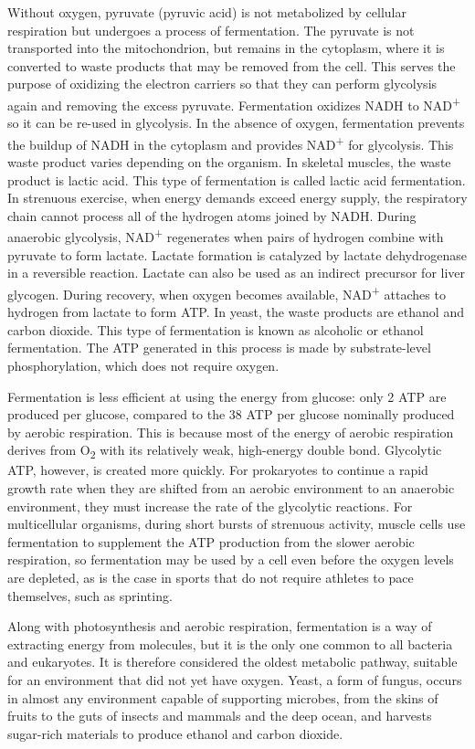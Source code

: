 Without oxygen, pyruvate (pyruvic acid) is not metabolized by cellular respiration but undergoes a process of fermentation. The pyruvate is not transported into the mitochondrion, but remains in the cytoplasm, where it is converted to waste products that may be removed from the cell. This serves the purpose of oxidizing the electron carriers so that they can perform glycolysis again and removing the excess pyruvate. Fermentation oxidizes NADH to NAD\textsuperscript{+} so it can be re-used in glycolysis. In the absence of oxygen, fermentation prevents the buildup of NADH in the cytoplasm and provides NAD\textsuperscript{+} for glycolysis. This waste product varies depending on the organism. In skeletal muscles, the waste product is lactic acid. This type of fermentation is called lactic acid fermentation. In strenuous exercise, when energy demands exceed energy supply, the respiratory chain cannot process all of the hydrogen atoms joined by NADH. During anaerobic glycolysis, NAD\textsuperscript{+} regenerates when pairs of hydrogen combine with pyruvate to form lactate. Lactate formation is catalyzed by lactate dehydrogenase in a reversible reaction. Lactate can also be used as an indirect precursor for liver glycogen. During recovery, when oxygen becomes available, NAD\textsuperscript{+} attaches to hydrogen from lactate to form ATP. In yeast, the waste products are ethanol and carbon dioxide. This type of fermentation is known as alcoholic or ethanol fermentation. The ATP generated in this process is made by substrate-level phosphorylation, which does not require oxygen.

Fermentation is less efficient at using the energy from glucose: only 2 ATP are produced per glucose, compared to the 38 ATP per glucose nominally produced by aerobic respiration. This is because most of the energy of aerobic respiration derives from O\textsubscript{2} with its relatively weak, high-energy double bond. Glycolytic ATP, however, is created more quickly. For prokaryotes to continue a rapid growth rate when they are shifted from an aerobic environment to an anaerobic environment, they must increase the rate of the glycolytic reactions. For multicellular organisms, during short bursts of strenuous activity, muscle cells use fermentation to supplement the ATP production from the slower aerobic respiration, so fermentation may be used by a cell even before the oxygen levels are depleted, as is the case in sports that do not require athletes to pace themselves, such as sprinting.

Along with photosynthesis and aerobic respiration, fermentation is a way of extracting energy from molecules, but it is the only one common to all bacteria and eukaryotes. It is therefore considered the oldest metabolic pathway, suitable for an environment that did not yet have oxygen. Yeast, a form of fungus, occurs in almost any environment capable of supporting microbes, from the skins of fruits to the guts of insects and mammals and the deep ocean, and harvests sugar-rich materials to produce ethanol and carbon dioxide.

